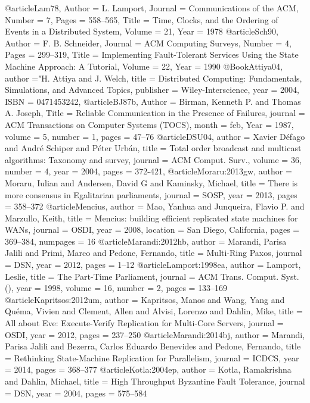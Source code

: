 @article{Lam78,
Author    = {L. Lamport},
Journal   = {Communications of the ACM},
Number    = {7},
Pages     = {558--565},
Title     = {Time, Clocks, and the Ordering of Events in a Distributed System},
Volume    = {21},
Year      = {1978}
}
@article{Sch90,
Author    = {F. B. Schneider},
Journal   = {ACM Computing Surveys},
Number    = {4},
Pages     = {299--319},
Title     = {Implementing Fault-Tolerant Services Using the State Machine Approach: {A} Tutorial},
Volume    = {22},
Year      = {1990}
}
@Book{Attiya04,
author    ={"H. Attiya and J. Welch},
title     =	{Distributed Computing: Fundamentals, Simulations, and Advanced Topics},
publisher =	{Wiley-Interscience},
year      =  {2004},
ISBN      = 	{0471453242},
}
@article{BJ87b,
Author    = {Birman, Kenneth P. and Thomas A. Joseph},
Title     = {Reliable Communication in the Presence of Failures},
journal   = {ACM Transactions on Computer Systems (TOCS)},
month     = {feb},
Year      = {1987},
volume    = {5},
number    = {1},
pages     = {47--76}
}
@article{DSU04,
author    = {Xavier D{\'e}fago and Andr{\'e} Schiper and P{\'e}ter Urb{\'a}n},
title     = {Total order broadcast and multicast algorithms: Taxonomy and survey},
journal   = {ACM Comput. Surv.},
volume    = {36},
number    = {4},
year      = {2004},
pages     = {372-421},
}
@article{Moraru:2013gw,
author    = {Moraru, Iulian and Andersen, David G and Kaminsky, Michael},
title     = {{There is more consensus in Egalitarian parliaments}},
journal   = {SOSP},
year      = {2013},
pages     = {358--372}
}
@article{Mencius,
author    = {Mao, Yanhua and Junqueira, Flavio P. and Marzullo, Keith},
title     = {Mencius: building efficient replicated state machines for WANs},
journal   = {OSDI},
year      = {2008},
location  = {San Diego, California},
pages     = {369--384},
numpages  = {16}
} 
@article{Marandi:2012hb,
author    = {Marandi, Parisa Jalili and Primi, Marco and Pedone, Fernando},
title     = {{Multi-Ring Paxos}},
journal   = {DSN},
year      = {2012},
pages     = {1--12}
}
@article{Lamport:1998ea,
author    = {Lamport, Leslie},
title     = {{The Part-Time Parliament}},
journal   = {ACM Trans. Comput. Syst. ()},
year      = {1998},
volume    = {16},
number    = {2},
pages     = {133--169}
}
@article{Kapritsos:2012um,
author    = {Kapritsos, Manos and Wang, Yang and Qu{\'e}ma, Vivien and Clement, Allen and Alvisi, Lorenzo and Dahlin, Mike},
title     = {{All about Eve: Execute-Verify Replication for Multi-Core Servers}},
journal   = {OSDI},
year      = {2012},
pages     = {237--250}
}
@article{Marandi:2014bj,
author    = {Marandi, Parisa Jalili and Bezerra, Carlos Eduardo Benevides and Pedone, Fernando},
title     = {{Rethinking State-Machine Replication for Parallelism}},
journal   = {ICDCS},
year      = {2014},
pages     = {368--377}
}
@article{Kotla:2004ep,
author    = {Kotla, Ramakrishna and Dahlin, Michael},
title     = {{High Throughput Byzantine Fault Tolerance}},
journal   = {DSN},
year      = {2004},
pages     = {575--584}
}

